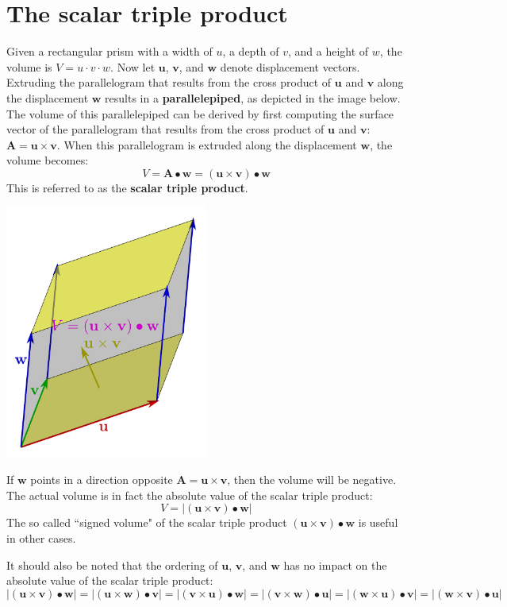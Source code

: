 \documentclass{article}
\begin{document}
\section*{The scalar triple product}

Given a rectangular prism with a width of \(u\), a depth of \(v\), and a height of \(w\), the volume is \(V = u \cdot v \cdot w\). Now let \(\mathbf{u}\), \(\mathbf{v}\), and \(\mathbf{w}\) denote displacement vectors. Extruding the parallelogram that results from the cross product of \(\mathbf{u}\) and \(\mathbf{v}\) along the displacement \(\mathbf{w}\) results in a {\bf parallelepiped}, as depicted in the image below. The volume of this parallelepiped can be derived by first computing the surface vector of the parallelogram that results from the cross product of \(\mathbf{u}\) and \(\mathbf{v}\): \(\mathbf{A} = \mathbf{u} \times \mathbf{v}\). When this parallelogram is extruded along the displacement \(\mathbf{w}\), the volume becomes:
\[V = \mathbf{A} \bullet \mathbf{w} = (\mathbf{u} \times \mathbf{v}) \bullet \mathbf{w}\] 
This is referred to as the {\bf scalar triple product}. 

\includegraphics[width = 0.5\textwidth]{scalar_triple_product}

If \(\mathbf{w}\) points in a direction opposite \(\mathbf{A} = \mathbf{u} \times \mathbf{v}\), then the volume will be negative. The actual volume is in fact the absolute value of the scalar triple product:
\[V = \left|(\mathbf{u} \times \mathbf{v}) \bullet \mathbf{w}\right|\]  
The so called ``signed volume" of the scalar triple product \((\mathbf{u} \times \mathbf{v}) \bullet \mathbf{w}\) is useful in other cases.

It should also be noted that the ordering of \(\mathbf{u}\), \(\mathbf{v}\), and \(\mathbf{w}\) has no impact on the absolute value of the scalar triple product:
\[\left|(\mathbf{u} \times \mathbf{v}) \bullet \mathbf{w}\right| = \left|(\mathbf{u} \times \mathbf{w}) \bullet \mathbf{v}\right| = \left|(\mathbf{v} \times \mathbf{u}) \bullet \mathbf{w}\right|= \left|(\mathbf{v} \times \mathbf{w}) \bullet \mathbf{u}\right| = \left|(\mathbf{w} \times \mathbf{u}) \bullet \mathbf{v}\right| = \left|(\mathbf{w} \times \mathbf{v}) \bullet \mathbf{u}\right|\]
\end{document}
